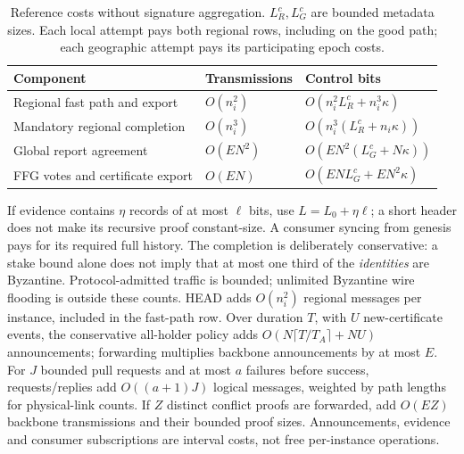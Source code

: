 \documentclass[11pt,a4paper,onecolumn]{article}
\theoremstyle{remark}\newtheorem{example}[definition]{Example}
\begin{document}
\begin{table}[htbp]\centering\small
\begin{tabularx}{\textwidth}{@{}p{}p{}Y@{}}\toprule
Component & Transmissions & Control bits\\\midrule
Regional fast path and export & $O(n_i^2)$ & $O(n_i^2L_R^c+n_i^3\kappa)$\\
Mandatory regional completion & $O(n_i^3)$ & $O(n_i^3(L_R^c+n_i\kappa))$\\
Global report agreement & $O(EN^2)$ & $O(EN^2(L_G^c+N\kappa))$\\
FFG votes and certificate export & $O(EN)$ & $O(ENL_G^c+EN^2\kappa)$\\\bottomrule
\end{tabularx}
\caption{Reference costs without signature aggregation. $L_R^c,L_G^c$ are
bounded metadata sizes. Each local attempt pays both regional rows, including
on the good path; each geographic attempt pays its participating epoch costs.}
\end{table}

If evidence contains $\eta$ records of at most $\ell$ bits, use
$L=L_0+\eta\ell$; a short header does not make its recursive proof constant-size.
A consumer syncing from genesis pays for its required full history. The
completion is deliberately conservative: a stake bound alone does not imply
that at most one third of the \emph{identities} are Byzantine. Protocol-admitted
traffic is bounded; unlimited Byzantine wire flooding is outside these counts.
HEAD adds $O(n_i^2)$ regional messages per instance, included in the fast-path
row. Over duration $T$, with $U$ new-certificate events, the conservative
all-holder policy adds $O(N\lceil T/T_A\rceil+NU)$ announcements; forwarding
multiplies backbone announcements by at most $E$. For $J$ bounded pull requests
and at most $a$ failures before success, requests/replies add $O((a+1)J)$ logical
messages, weighted by path lengths for physical-link counts. If $Z$ distinct
conflict proofs are forwarded, add $O(EZ)$ backbone transmissions and their
bounded proof sizes. Announcements, evidence and consumer subscriptions are
interval costs, not free per-instance operations.
\end{document}
